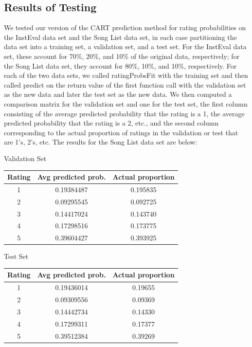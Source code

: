 \documentclass{article}
\begin{document}
\subsection{Results of Testing}
We tested our version of the CART prediction method for rating probabilities on the InstEval data set and the Song List data set, in each case partitioning the data set into a training set, a validation set, and a test set. For the InstEval data set, these account for 70\%, 20\%, and 10\% of the original data, respectively; for the Song List data set, they account for 80\%, 10\%, and 10\%, respectively. For each of the two data sets, we called ratingProbsFit with the training set and then called predict on the return value of the first function call with the validation set as the new data and later the test set as the new data. We then computed a comparison matrix for the validation set and one for the test set, the first column consisting of the average predicted probability that the rating is a 1, the average predicted probability that the rating is a 2, etc., and the second column corresponding to the actual proportion of ratings in the validation or test that are 1's, 2's, etc. The results for the Song List data set are below:

\begin{center}
    Validation Set
    \begin{tabular}{c|c|c}
        Rating & Avg predicted prob. & Actual proportion \\
        \hline
        1 & 0.19384487 & 0.195835 \\
        2 & 0.09295545 & 0.092725 \\
        3 & 0.14417024 & 0.143740 \\
        4 & 0.17298516 & 0.173775 \\
        5 & 0.39604427 & 0.393925 \\
    \end{tabular}
\end{center}

\begin{center}
    Test Set
    \begin{tabular}{c|c|c}
        Rating & Avg predicted prob. & Actual proportion \\
        \hline
        1 & 0.19436014 & 0.19655 \\
        2 & 0.09309556 & 0.09369 \\
        3 & 0.14442734 & 0.14330 \\
        4 & 0.17299311 & 0.17377 \\
        5 & 0.39512384 & 0.39269 \\
    \end{tabular}
\end{center}
\end{document}
